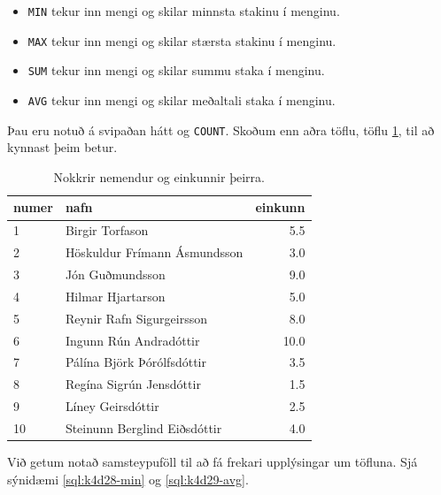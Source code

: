 \begin{itemize}
 \item \verb|MIN| tekur inn mengi og skilar minnsta stakinu í menginu.
 \item \verb|MAX| tekur inn mengi og skilar stærsta stakinu í menginu.
 \item \verb|SUM| tekur inn mengi og skilar summu staka í menginu.
 \item \verb|AVG| tekur inn mengi og skilar meðaltali staka í menginu.
\end{itemize}

Þau eru notuð á svipaðan hátt og \verb|COUNT|. Skoðum enn aðra töflu, töflu \ref{tafla:einkunnir}, til að kynnast þeim betur.

\begin{table}
\centering
\caption[Einkunnir]{Nokkrir nemendur og einkunnir þeirra.}
\label{tafla:einkunnir}
\begin{tabular}{llr}
\toprule
numer&nafn&einkunn\\
\midrule
1&Birgir Torfason&5.5\\
2&Höskuldur Frímann Ásmundsson&3.0\\
3&Jón Guðmundsson&9.0\\
4&Hilmar Hjartarson&5.0\\
5&Reynir Rafn Sigurgeirsson&8.0\\
6&Ingunn Rún Andradóttir&10.0\\
7&Pálína Björk Þórólfsdóttir&3.5\\
8&Regína Sigrún Jensdóttir&1.5\\
9&Líney Geirsdóttir&2.5\\
10&Steinunn Berglind Eiðsdóttir&4.0\\
\bottomrule
\end{tabular}
\end{table}

Við getum notað samsteypuföll til að fá frekari upplýsingar um töfluna. Sjá sýnidæmi \ref{sql:k4d28-min} og \ref{sql:k4d29-avg}.


